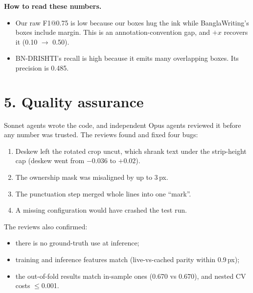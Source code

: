 \documentclass[10.5pt,a4paper]{article}
\begin{document}
\textbf{How to read these numbers.}
\begin{itemize}
  \item Our raw F1@0.75 is low because our boxes hug the ink while BanglaWriting's boxes include
        margin. This is an annotation-convention gap, and $+x$ recovers it (0.10 $\rightarrow$ 0.50).
  \item BN-DRISHTI's recall is high because it emits many overlapping boxes. Its precision is 0.485.
\end{itemize}

\section*{5. Quality assurance}
Sonnet agents wrote the code, and independent Opus agents reviewed it before any number was
trusted. The reviews found and fixed four bugs:
\begin{enumerate}
  \item Deskew left the rotated crop uncut, which shrank text under the strip-height cap (deskew
        went from $-0.036$ to $+0.02$).
  \item The ownership mask was misaligned by up to 3\,px.
  \item The punctuation step merged whole lines into one ``mark''.
  \item A missing configuration would have crashed the test run.
\end{enumerate}
The reviews also confirmed:
\begin{itemize}
  \item there is no ground-truth use at inference;
  \item training and inference features match (live-vs-cached parity within 0.9\,px);
  \item the out-of-fold results match in-sample ones (0.670 vs 0.670), and nested CV costs
        $\leq$0.001.
\end{itemize}
\end{document}

